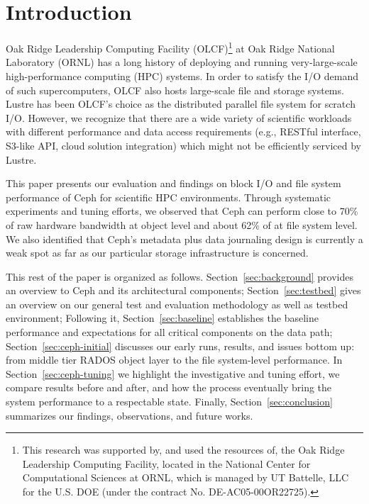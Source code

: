 \section{Introduction}

Oak Ridge Leadership Computing Facility (OLCF)\footnote{This research was
supported by, and used the resources of, the Oak Ridge Leadership Computing
Facility, located in the National Center for Computational Sciences at ORNL,
which is managed by UT Battelle, LLC for the U.S. DOE (under the contract No.
DE-AC05-00OR22725).} at Oak Ridge National Laboratory (ORNL) has a long history
of deploying and running very-large-scale high-performance computing (HPC)
systems. 
In order to satisfy the I/O demand of such supercomputers, OLCF
also hosts large-scale file and storage systems. Lustre has been OLCF's choice
as the distributed parallel file system for scratch I/O. 
However, we
recognize that there are a wide variety of scientific 
workloads with different performance and data access requirements (e.g., RESTful
interface, S3-like API, cloud solution integration) which might not be
efficiently serviced by Lustre. 

This paper presents our evaluation and findings on block I/O and file system
performance of Ceph for scientific HPC environments. Through systematic
experiments and tuning efforts, we observed that Ceph can perform close to
70\% of raw hardware bandwidth at object level and about 62\% of at file
system level. We also identified that Ceph's metadata plus data journaling
design is currently a weak spot as far as our particular storage
infrastructure is concerned.

This rest of the paper is organized as follows. Section~\ref{sec:background}
provides an overview to Ceph and its architectural components;
Section~\ref{sec:testbed} gives an overview on our general test and evaluation
methodology as well as testbed environment; Following it,
Section~\ref{sec:baseline} establishes the baseline performance and
expectations for all critical components on the data path;
Section~\ref{sec:ceph-initial} discusses our early runs, results, and issues
bottom up: from middle tier RADOS object layer to the file system-level
performance. In Section~\ref{sec:ceph-tuning} we highlight the investigative
and tuning effort, we compare results before and after, and how the process
eventually bring the system performance to a respectable state. Finally,
Section~\ref{sec:conclusion} summarizes our findings, observations, and future
works.
